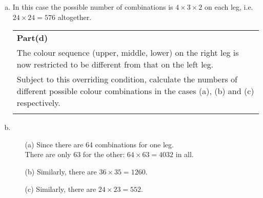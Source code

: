 \documentclass[a4paper,12pt]{article}
\begin{document}
\begin{enumerate}[(a)]
\large
\item In this case the possible number of combinations is $4\times 3 \times 2 $ on each leg, i.e. $24\times
24 = 576$ altogether.
\newpage


  \begin{table}[ht!]
     \centering
     \begin{tabular}{|p{15cm}|}
     \hline  
\noindent \textbf{Part(d)}\\ \smallskip \large The colour sequence (upper, middle, lower) on the right leg is now restricted to be different from that on the left leg. \\ \large Subject to this overriding condition, calculate the numbers of different possible colour combinations in the cases (a), (b) and (c) respectively. \smallskip \\
 \\ \hline 
      \end{tabular}
    \end{table} 
    
    
\item 
\begin{itemize}
\item[(a)] Since there are 64 combinations for one leg. \\ There are only 63 for the other:
$64 \times 63 = 4032$ in all.
\item[(b)] Similarly, there are $36 \times 35 = 1260$.
\item[(c)] Similarly, there are $24 \times 23 = 552$.
\end{itemize}
\end{enumerate}
\end{document}
